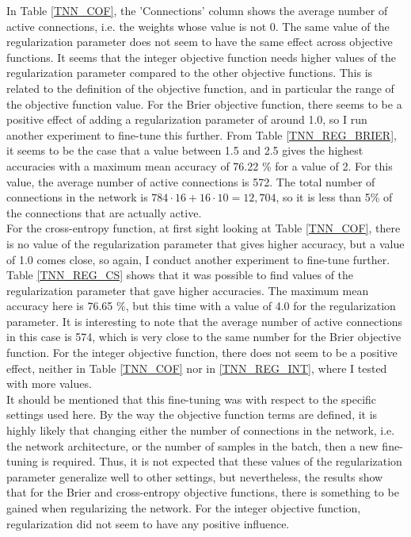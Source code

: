 \noindent In Table \ref{TNN_COF}, the 'Connections' column shows the average number of active connections, i.e. the weights whose value is not 0. The same value of the regularization parameter does not seem to have the same effect across objective functions. It seems that the integer objective function needs higher values of the regularization parameter compared to the other objective functions. This is related to the definition of the objective function, and in particular the range of the objective function value. For the Brier objective function, there seems to be a positive effect of adding a regularization parameter of around 1.0, so I run another experiment to fine-tune this further. From Table \ref{TNN_REG_BRIER}, it seems to be the case that a value between 1.5 and 2.5 gives the highest accuracies with a maximum mean accuracy of 76.22 \% for a value of 2. For this value, the average number of active connections is 572. The total number of connections in the network is $784 \cdot 16 + 16 \cdot 10 = 12,704$, so it is less than 5\% of the connections that are actually active. \\



\noindent For the cross-entropy function, at first sight looking at Table \ref{TNN_COF}, there is no value of the regularization parameter that gives higher accuracy, but a value of 1.0 comes close, so again, I conduct another experiment to fine-tune further. Table \ref{TNN_REG_CS} shows that it was possible to find values of the regularization parameter that gave higher accuracies. The maximum mean accuracy here is 76.65 \%, but this time with a value of 4.0 for the regularization parameter. It is interesting to note that the average number of active connections in this case is 574, which is very close to the same number for the Brier objective function. For the integer objective function, there does not seem to be a positive effect, neither in Table \ref{TNN_COF} nor in \ref{TNN_REG_INT}, where I tested with more values. \\

\noindent It should be mentioned that this fine-tuning was with respect to the specific settings used here. By the way the objective function terms are defined, it is highly likely that changing either the number of connections in the network, i.e. the network architecture, or the number of samples in the batch, then a new fine-tuning is required. Thus, it is not expected that these values of the regularization parameter generalize well to other settings, but nevertheless, the results show that for the Brier and cross-entropy objective functions, there is something to be gained when regularizing the network. For the integer objective function, regularization did not seem to have any positive influence. 



\newpage

